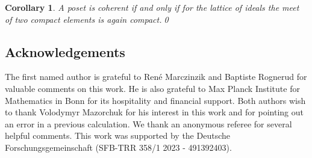 \documentclass[a4paper]{amsart}
\theoremstyle{plain}
\newtheorem{cor}[thm]{Corollary}
\theoremstyle{definition}
\theoremstyle{remark}
\numberwithin{equation}{section}
\begin{document}
\begin{cor}
A poset is coherent if and only if for the lattice of ideals the
meet of two compact elements is again compact.\qed
\end{cor}

\subsection*{Acknowledgements}

The first named author is grateful to Ren\'e Marczinzik and Baptiste
Rognerud for valuable comments on this work. He is also grateful to
Max Planck Institute for Mathematics in Bonn for its hospitality and
financial support. Both authors wish to thank Volodymyr Mazorchuk for
his interest in this work and for pointing out an error in a previous
calculation. We thank an anonymous referee for several helpful
comments.  This work was supported by the Deutsche
Forschungsgemeinschaft (SFB-TRR 358/1 2023 - 491392403).
\end{document}
